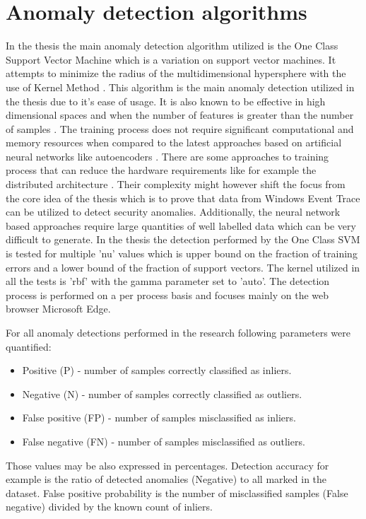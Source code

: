 \documentclass[a4paper,twoside,12pt]{book}
\begin{document}
\section{Anomaly detection algorithms}
In the thesis the main anomaly detection algorithm utilized is the One Class Support 
Vector Machine which is a variation on support vector machines. It attempts to minimize 
the radius of the multidimensional hypersphere with the use of Kernel Method \cite{bib:ocsvm}. 
This algorithm is the main anomaly detection utilized in the thesis due to it's ease of
usage. It is also known to be effective in high dimensional spaces and when 
the number of features is greater than the number of samples \cite{bib:svms}. The training process 
does not require significant computational and memory resources when compared to the latest
approaches based on artificial neural networks like autoencoders \cite{bib:autoencoder}. There are
some approaches to training process that can reduce the hardware requirements like for example the distributed architecture
\cite{bib:autoencoderDist}. Their complexity might however shift the focus from the core idea 
of the thesis which is to prove that data from Windows Event Trace can be utilized to detect security
anomalies. Additionally, the neural network based approaches require large quantities of well labelled
data which can be very difficult to generate. In the thesis the detection performed by the One Class SVM 
is tested for multiple 'nu' values which is upper bound on the fraction of training errors and a lower bound of the 
fraction of support vectors\cite{bib:skocsvm}. The kernel utilized in all the tests is 'rbf' with
the gamma parameter set to 'auto'. The detection process is performed 
on a per process basis and focuses mainly on the web browser Microsoft Edge. 

For all anomaly detections performed in the research following parameters were quantified:
\begin{itemize}
	\item Positive (P) - number of samples correctly classified as inliers.
	\item Negative (N) - number of samples correctly classified as outliers.
	\item False positive (FP) - number of samples misclassified as inliers. 
	\item False negative (FN) - number of samples misclassified as outliers.
\end{itemize}

Those values may be also expressed in percentages. Detection accuracy for example is the ratio
of detected anomalies (Negative) to all marked in the dataset. False positive probability is 
the number of misclassified samples (False negative) divided by the known count of inliers.  
\end{document}
